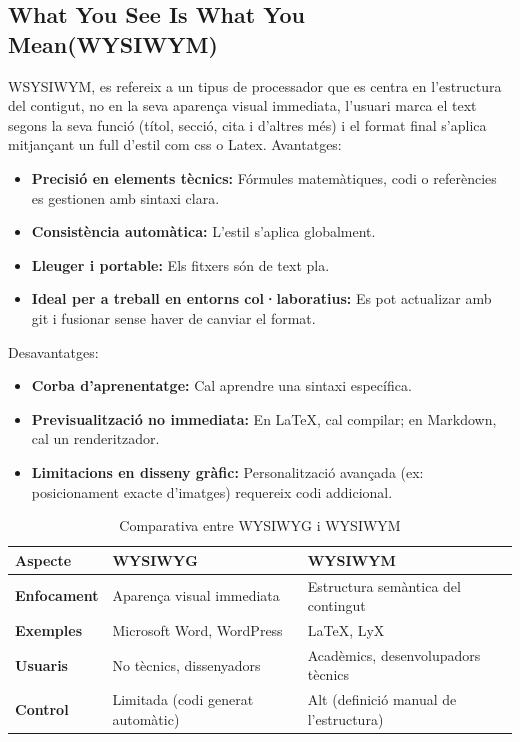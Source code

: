 \subsection{What You See Is What You Mean(WYSIWYM)}\label{subsec:4.2.2}
WSYSIWYM, es refereix a un tipus de processador que es centra en l'estructura del contigut, no en la seva aparença visual immediata, l'usuari marca el text segons la seva funció (títol, secció, cita i d'altres més) i el format final s'aplica mitjançant un full d'estil com css o Latex.
Avantatges:
\begin{itemize}
\item \textbf{Precisió en elements tècnics:} Fórmules matemàtiques, codi o referències es gestionen amb sintaxi clara.
\item \textbf{Consistència automàtica:} L'estil s'aplica globalment.
\item \textbf{Lleuger i portable:} Els fitxers són de text pla.
 \item \textbf{Ideal per a treball en entorns col·laboratius:} Es pot actualizar amb git i fusionar sense haver de canviar el format.
\end{itemize}
Desavantatges:
\begin{itemize}
\item \textbf{Corba d'aprenentatge:} Cal aprendre una sintaxi específica.
 \item \textbf{Previsualització no immediata:} En LaTeX, cal compilar; en Markdown, cal un renderitzador.
 \item \textbf{Limitacions en disseny gràfic:} Personalització avançada (ex: posicionament exacte d'imatges) requereix codi addicional.
\end{itemize}

\begin{table}[h!]
\begin{tabular}{|l|l|l|}
\hline
\textbf{Aspecte} & \textbf{WYSIWYG} & \textbf{WYSIWYM} \\ \hline
\textbf{Enfocament} & Aparença visual immediata & Estructura semàntica del contingut \\ \hline
\textbf{Exemples} & Microsoft Word, WordPress & LaTeX, LyX \\ \hline
\textbf{Usuaris} & No tècnics, dissenyadors &  Acadèmics, desenvolupadors tècnics \\ \hline
\textbf{Control} &  Limitada (codi generat automàtic) & Alt (definició manual de l'estructura) \\ \hline
\end{tabular}
\caption{Comparativa entre WYSIWYG i WYSIWYM}
\end{table}



